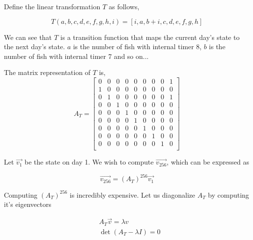 \documentclass{article}
\begin{document}
\setlength{\parindent}{0ex}
Define the linear transformation \(T\) as follows,

\begin{equation}
    T(a,b,c,d,e,f,g,h,i) = [i, a, b + i, c, d, e, f, g, h]
\end{equation}

We can see that \(T\) is a transition function that maps the current day's state
to the next day's state. \(a\) is the number of fish with internal timer 8,
\(b\) is the number of fish with internal timer 7 and so on...

The matrix representation of \(T\) is,
\begin{equation}
    A_T =
    \begin{bmatrix}
        0 & 0 & 0 & 0 & 0 & 0 & 0 & 0 & 1 \\
        1 & 0 & 0 & 0 & 0 & 0 & 0 & 0 & 0 \\
        0 & 1 & 0 & 0 & 0 & 0 & 0 & 0 & 1 \\
        0 & 0 & 1 & 0 & 0 & 0 & 0 & 0 & 0 \\
        0 & 0 & 0 & 1 & 0 & 0 & 0 & 0 & 0 \\
        0 & 0 & 0 & 0 & 1 & 0 & 0 & 0 & 0 \\
        0 & 0 & 0 & 0 & 0 & 1 & 0 & 0 & 0 \\
        0 & 0 & 0 & 0 & 0 & 0 & 1 & 0 & 0 \\
        0 & 0 & 0 & 0 & 0 & 0 & 0 & 1 & 0 \\
    \end{bmatrix}
\end{equation}

Let \(\vec{v_1}\) be the state on day 1. We wish to compute \(\vec{v_{256}}\),
which can be expressed as

\begin{equation}
    \vec{v_{256}} = (A_T)^{256}\vec{v_1}
\end{equation}

Computing \((A_T)^{256}\) is incredibly expensive. Let us diagonalize \(A_T\) by
computing it's eigenvectors



\begin{align}
     & A_T\vec{v} = \lambda v    \\
     & \det(A_T - \lambda I) = 0
\end{align}
\end{document}
